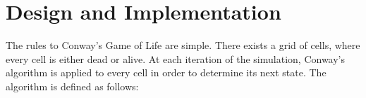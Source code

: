\documentclass[onecolumn,12pt]{IEEEtran}
\begin{document}
\section{Design and Implementation}

The rules to Conway's Game of Life are simple. There exists a grid of cells,
where every cell is either dead or alive. At each iteration of the simulation,
Conway's algorithm is applied to every cell in order to determine its next
state. The algorithm is defined as follows:
\end{document}
